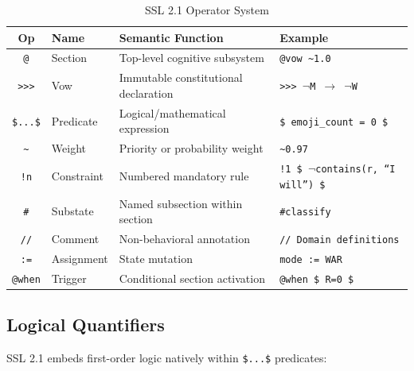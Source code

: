 \documentclass[12pt,a4paper]{article}
\theoremstyle{plain}
\theoremstyle{definition}
\theoremstyle{remark}
\begin{document}
\begin{table}[H]
\centering
\caption{SSL 2.1 Operator System}
\label{tab:operators}
\begin{tabular}{@{}clll@{}}
\toprule
\textbf{Op} & \textbf{Name} & \textbf{Semantic Function} & \textbf{Example} \\
\midrule
\texttt{@} & Section & Top-level cognitive subsystem & \texttt{@vow \~{}1.0} \\
\texttt{>>>} & Vow & Immutable constitutional declaration & \texttt{>>> \(\neg\)M \(\to\) \(\neg\)W} \\
\texttt{\$...\$} & Predicate & Logical/mathematical expression & \texttt{\$ emoji\_count = 0 \$} \\
\texttt{\~{}} & Weight & Priority or probability weight & \texttt{\~{}0.97} \\
\texttt{!n} & Constraint & Numbered mandatory rule & \texttt{!1 \$ \(\neg\)contains(r, ``I will'') \$} \\
\texttt{\#} & Substate & Named subsection within section & \texttt{\#classify} \\
\texttt{//} & Comment & Non-behavioral annotation & \texttt{// Domain definitions} \\
\texttt{:=} & Assignment & State mutation & \texttt{mode := WAR} \\
\texttt{@when} & Trigger & Conditional section activation & \texttt{@when \$ R=0 \$} \\
\bottomrule
\end{tabular}
\end{table}

\subsection{Logical Quantifiers}

SSL 2.1 embeds first-order logic natively within \texttt{\$...\$} predicates:
\end{document}
